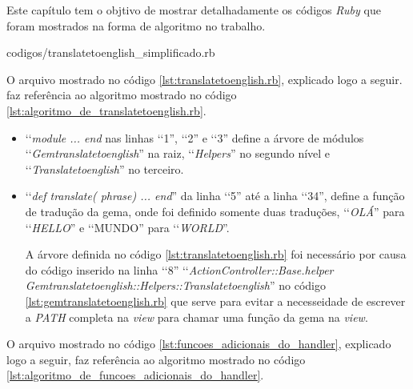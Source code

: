 Este capítulo tem o objtivo de mostrar detalhadamente os códigos \emph{Ruby} que foram mostrados na forma
de algoritmo no trabalho.


{codigos/translatetoenglish_simplificado.rb}

O arquivo mostrado no código \ref{lst:translatetoenglish.rb}, explicado logo a seguir. faz referência
ao algoritmo mostrado no código \ref{lst:algoritmo_de_translatetoenglish.rb}.

\begin{itemize}

  \item ‘‘\emph{module ... end} nas linhas ‘‘1'', ‘‘2'' e ‘‘3'' define a árvore de módulos
  ‘‘\emph{Gemtranslatetoenglish}'' na raiz, ‘‘\emph{Helpers}'' no segundo nível e ‘‘\emph{Translatetoenglish}'' no
  terceiro.
  
  \item ‘‘\emph{def translate( phrase) ... end}'' da linha ‘‘5'' até a linha ‘‘34'', define
  a função de tradução da gema, onde foi definido somente duas traduções, ‘‘\emph{OLÁ}''
  para ‘‘\emph{HELLO}'' e ‘‘MUNDO'' para ‘‘\emph{WORLD}''.

  A árvore definida no código \ref{lst:translatetoenglish.rb} foi necessário por causa do código
  inserido na linha ‘‘8'' ‘‘\emph{ActionController::Base.helper Gemtranslatetoenglish::Helpers::Translatetoenglish}''
  no código \ref{lst:gemtranslatetoenglish.rb} que serve para evitar a necesseidade de escrever a
  \emph{PATH} completa na \emph{view} para chamar uma função da gema na \emph{view}.

\end{itemize}


O arquivo mostrado no código \ref{lst:funcoes_adicionais_do_handler}, explicado logo a seguir, faz
referência ao algoritmo mostrado no código \ref{lst:algoritmo_de_funcoes_adicionais_do_handler}.

